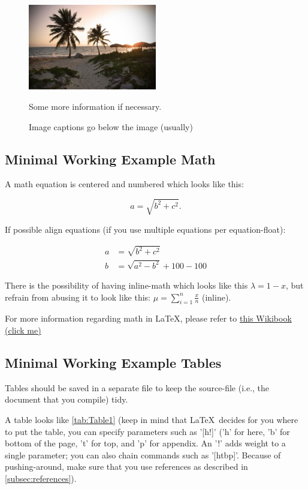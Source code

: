 \documentclass[12pt,a4paper]{article}
\begin{document}
\begin{figure}[h]
\centering
\includegraphics[width=0.5\textwidth]{pictures/beach.jpg} 
\caption{Image captions go below the image (usually)}
\small Some more information if necessary.
\end{figure}


\subsection{Minimal Working Example Math}
\label{subsec:math}
A math equation is centered and numbered which looks like this:

\begin{equation}
a = \sqrt{b^2 + c^2}.
\end{equation}

If possible align equations (if you use multiple equations per equation-float):

\begin{equation}
\begin{split}
a &= \sqrt{b^2 + c^2}\\
b &= \sqrt{a^2 - b^2} + 100 - 100 
\end{split}
\end{equation}

There is the possibility of having inline-math which looks like this $\lambda = 1 - x$, but refrain from abusing it to look like this: $\mu = \displaystyle \sum_{i = 1}^{n} \frac{x}{n}$ (inline).

For more information regarding math in \LaTeX, please refer to \href{https://en.wikibooks.org/wiki/LaTeX/Mathematics}{this Wikibook (click me)}

\subsection{Minimal Working Example Tables}
Tables should be saved in a separate file to keep the source-file (i.e., the document that you compile) tidy.

A table looks like \autoref{tab:Table1} (keep in mind that \LaTeX \ decides for you where to put the table, you can specify parameters such as '[h!]' ('h' for here, 'b' for bottom of the page, 't' for top, and 'p' for appendix. An '!' adds weight to a single parameter; you can also chain commands such as '[htbp]'. Because of pushing-around, make sure that you use references as described in \autoref{subsec:references}). 
\end{document}
